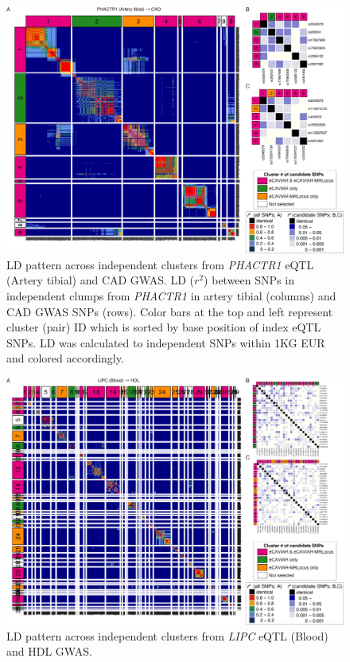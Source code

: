 \documentclass[11pt]{article}
\begin{document}
\begin{figure}[!ht]
  \centering
  \includegraphics[width=.7\textwidth]{figs/region/heatmap_eQTLbase.Artery_PHACTR1_CAD.20201217.png}
  \caption{LD pattern across independent clusters from \emph{PHACTR1}
    eQTL (Artery tibial) and CAD GWAS. LD ($r^2$) between SNPs in
    independent clumps from \emph{PHACTR1} in artery tibial (columns)
    and CAD GWAS SNPs (rows). Color bars at the top and left represent
    cluster (pair) ID which is sorted by base position of index eQTL
    SNPs. LD was calculated to independent SNPs within 1KG EUR and
    colored accordingly.} 
\end{figure}

\begin{figure}[!ht]
  \centering
  \includegraphics[width=.7\textwidth]{figs/region/heatmap_eQTLbase.Blood_LIPC_HDL.20201217.png}
  \caption{LD pattern across independent clusters from \emph{LIPC}
    eQTL (Blood) and HDL GWAS.}
\end{figure}
\end{document}
